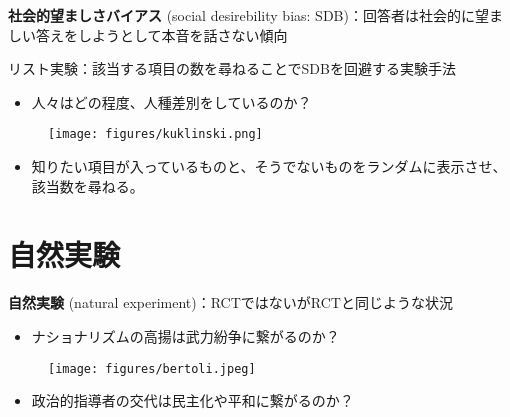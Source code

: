 \documentclass[
  xelatex,
  ja=standard]{bxjsarticle}
\providecommand{\tightlist}{%
  \setlength{\itemsep}{0pt}\setlength{\parskip}{0pt}}\usepackage{longtable,booktabs,array}
\begin{document}
\textbf{社会的望ましさバイアス} (social desirebility bias:
SDB)：回答者は社会的に望ましい答えをしようとして本音を話さない傾向

リスト実験：該当する項目の数を尋ねることでSDBを回避する実験手法

\begin{itemize}
\tightlist
\item
  人々はどの程度、人種差別をしているのか？\citep{kuklinski1997}
\end{itemize}

\begin{figure}[htpb]

{\centering \texttt{[image: figures/kuklinski.png]}

}

\caption{\citet{kuklinski1997}}

\end{figure}

\begin{itemize}
\tightlist
\item
  知りたい項目が入っているものと、そうでないものをランダムに表示させ、該当数を尋ねる。
\end{itemize}

\hypertarget{ux81eaux7136ux5b9fux9a13}{%
\section{自然実験}\label{ux81eaux7136ux5b9fux9a13}}

\textbf{自然実験} (natural experiment)：RCTではないがRCTと同じような状況

\begin{itemize}
\tightlist
\item
  ナショナリズムの高揚は武力紛争に繋がるのか？\citep{bertoli2017}
\end{itemize}

\begin{figure}[htpb]

{\centering \texttt{[image: figures/bertoli.jpeg]}

}

\caption{\citet{bertoli2017}}

\end{figure}

\begin{itemize}
\tightlist
\item
  政治的指導者の交代は民主化や平和に繋がるのか？\citep{jones2009}
\end{itemize}
\end{document}
